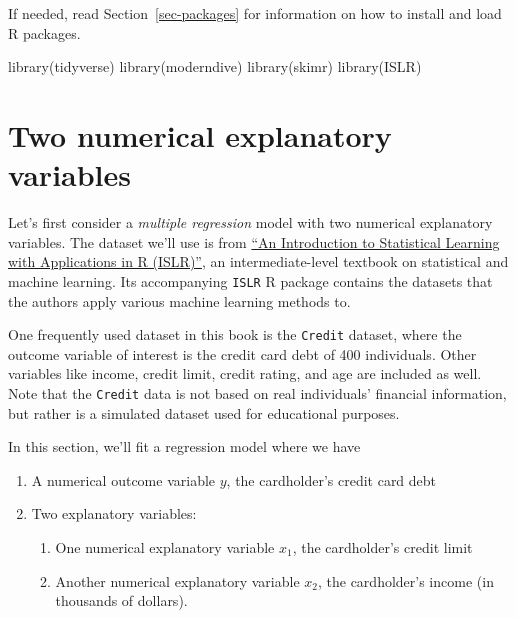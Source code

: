 \documentclass[
  letterpaper,
  DIV=11,
  numbers=noendperiod]{scrreprt}
\newenvironment{Shaded}{\begin{snugshade}}{\end{snugshade}}
\newcommand{\FunctionTok}[1]{\textcolor[rgb]{0.28,0.35,0.67}{#1}}
\newcommand{\NormalTok}[1]{\textcolor[rgb]{0.00,0.23,0.31}{#1}}
\providecommand{\tightlist}{%
  \setlength{\itemsep}{0pt}\setlength{\parskip}{0pt}}\usepackage{longtable,booktabs,array}
\theoremstyle{definition}
\theoremstyle{remark}
\begin{document}
If needed, read Section~\ref{sec-packages} for information on how to
install and load R packages.

\begin{Shaded}
\begin{Highlighting}[]
\FunctionTok{library}\NormalTok{(tidyverse)}
\FunctionTok{library}\NormalTok{(moderndive)}
\FunctionTok{library}\NormalTok{(skimr)}
\FunctionTok{library}\NormalTok{(ISLR)}
\end{Highlighting}
\end{Shaded}

\hypertarget{sec-model3}{%
\section{Two numerical explanatory variables}\label{sec-model3}}

Let's first consider a \emph{multiple regression} model with two
numerical explanatory variables. The dataset we'll use is from
\href{http://www-bcf.usc.edu/~gareth/ISL/}{``An Introduction to
Statistical Learning with Applications in R (ISLR)''}, an
intermediate-level textbook on statistical and machine learning. Its
accompanying \texttt{ISLR} R package contains the datasets that the
authors apply various machine learning methods to.

One frequently used dataset in this book is the \texttt{Credit} dataset,
where the outcome variable of interest is the credit card debt of 400
individuals. Other variables like income, credit limit, credit rating,
and age are included as well. Note that the \texttt{Credit} data is not
based on real individuals' financial information, but rather is a
simulated dataset used for educational purposes.

In this section, we'll fit a regression model where we have

\begin{enumerate}
\def\labelenumi{\arabic{enumi}.}
\tightlist
\item
  A numerical outcome variable \(y\), the cardholder's credit card debt
\item
  Two explanatory variables:

  \begin{enumerate}
  \def\labelenumii{\arabic{enumii}.}
  \tightlist
  \item
    One numerical explanatory variable \(x_1\), the cardholder's credit
    limit
  \item
    Another numerical explanatory variable \(x_2\), the cardholder's
    income (in thousands of dollars).
  \end{enumerate}
\end{enumerate}
\end{document}
